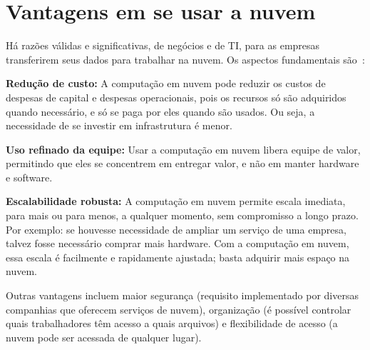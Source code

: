 \section{Vantagens em se usar a nuvem}

Há razões válidas e significativas, de negócios e de TI, para as empresas 
transferirem seus dados para trabalhar na nuvem. Os aspectos fundamentais 
são~\cite{cloud-computing-fundamentals}:

\newcommand{\itemm}[1]{\item\textbf{#1}}

\begin{itemise}
    \itemm{Redução de custo:} A computação em nuvem pode reduzir os custos de
        despesas de capital e despesas operacionais, pois os recursos só são 
        adquiridos quando necessário, e só se paga por eles quando são usados. Ou 
        seja, a necessidade de se investir em infrastrutura é menor. 

    \itemm{Uso refinado da equipe:} Usar a computação em nuvem libera equipe de
        valor, permitindo que eles se concentrem em entregar valor, e não em manter
        hardware e software.

    \itemm {Escalabilidade robusta:} A computação em nuvem permite escala imediata,
        para mais ou para menos, a qualquer momento, sem compromisso a longo prazo. 
        Por exemplo: se houvesse necessidade de ampliar um serviço de uma empresa, 
        talvez fosse necessário comprar mais hardware. Com a computação em nuvem, 
        essa escala é facilmente e rapidamente ajustada; basta adquirir mais espaço 
        na nuvem.

\end{itemise}

Outras vantagens incluem maior segurança (requisito implementado por diversas 
companhias que oferecem serviços de nuvem), organização (é possível controlar quais 
trabalhadores têm acesso a quais arquivos) e flexibilidade de acesso (a nuvem pode 
ser acessada de qualquer lugar).

\undef\itemm

